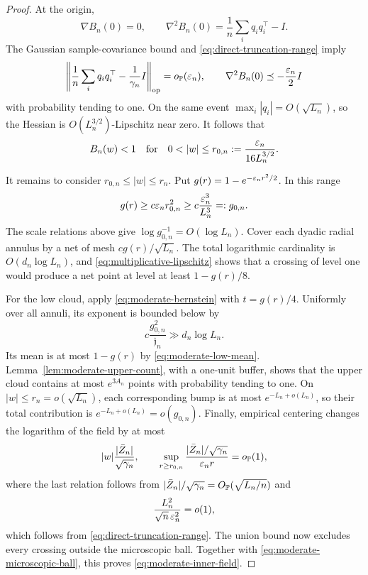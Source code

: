 \begin{proof}
At the origin,
\[
  \nabla B_n(0)=0,
  \qquad
  \nabla^2B_n(0)=\frac1n\sum_iq_iq_i^\top-I.
\]
The Gaussian sample-covariance bound and
\eqref{eq:direct-truncation-range} imply
\begin{equation}
\label{eq:moderate-origin-curvature}
  \left\|\frac1n\sum_iq_iq_i^\top-\frac1{\gamma_n}I\right\|_{\rm op}
  =o_{\mathbb P}(\varepsilon_n),
  \qquad
  \nabla^2B_n(0)\preceq-\frac{\varepsilon_n}{2}I
\end{equation}
with probability tending to one. On the same event
\(\max_i|q_i|=O(\sqrt{L_n})\), so the Hessian is
\(O(L_n^{3/2})\)-Lipschitz near zero. It follows that
\begin{equation}
\label{eq:moderate-microscopic-ball}
  B_n(w)<1
  \quad\text{for}\quad
  0<|w|\le r_{0,n}:=\frac{\eps_n}{16L_n^{3/2}}.
\end{equation}

It remains to consider \(r_{0,n}\le|w|\le r_n\). Put
\(g(r)=1-e^{-\varepsilon_nr^2/2}\). In this range
\[
  g(r)\ge c\varepsilon_nr_{0,n}^2
  \ge c\frac{\varepsilon_n^3}{L_n^3}=:g_{0,n}.
\]
The scale relations above give
\(\log g_{0,n}^{-1}=O(\log L_n)\). Cover each dyadic radial annulus by a
net of mesh \(c g(r)/\sqrt{L_n}\). The total logarithmic cardinality is
\(O(d_n\log L_n)\), and
\eqref{eq:multiplicative-lipschitz} shows that a crossing of level one would
produce a net point at level at least \(1-g(r)/8\).

For the low cloud, apply \eqref{eq:moderate-bernstein} with
\(t=g(r)/4\). Uniformly over all annuli, its exponent is bounded below by
\[
  c\frac{g_{0,n}^2}{\mathfrak j_n}\gg d_n\log L_n.
\]
Its mean is at most \(1-g(r)\) by
\eqref{eq:moderate-low-mean}. Lemma~\ref{lem:moderate-upper-count}, with a
one-unit buffer, shows that the upper cloud contains at most
\(e^{3A_n}\) points with probability tending to one. On
\(|w|\le r_n=o(\sqrt{L_n})\), each corresponding bump is at most
\(e^{-L_n+o(L_n)}\), so their total contribution is
\(e^{-L_n+o(L_n)}=o(g_{0,n})\). Finally, empirical centering changes the
logarithm of the field by at most
\[
  |w|\frac{|\bar Z_n|}{\sqrt{\gamma_n}},
  \qquad
  \sup_{r\ge r_{0,n}}
  \frac{|\bar Z_n|/\sqrt{\gamma_n}}{\varepsilon_nr}
  =o_{\mathbb P}(1),
\]
where the last relation follows from
\(|\bar Z_n|/\sqrt{\gamma_n}=O_{\mathbb P}(\sqrt{L_n/n})\) and
\[
 \frac{L_n^2}{\sqrt n\,\varepsilon_n^2}=o(1),
\]
which follows from \eqref{eq:direct-truncation-range}. The union bound now excludes every crossing outside
the microscopic ball. Together with
\eqref{eq:moderate-microscopic-ball}, this proves
\eqref{eq:moderate-inner-field}.
\end{proof}

